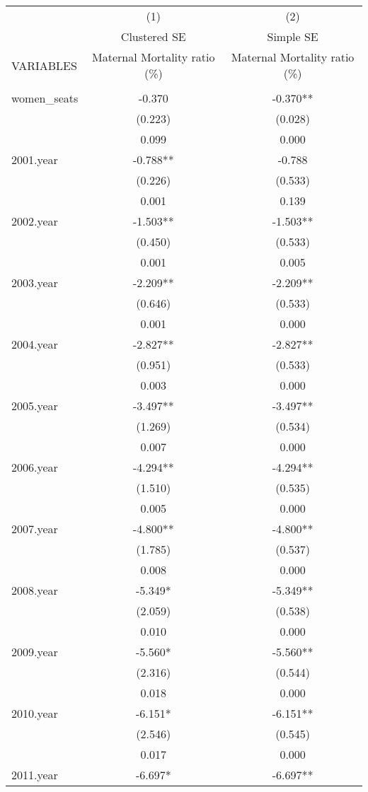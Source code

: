 \begin{tabular}{lcc} \hline
 & (1) & (2) \\
 & Clustered SE & Simple SE \\
VARIABLES & Maternal Mortality ratio (\%) & Maternal Mortality ratio (\%) \\ \hline
 &  &  \\
women\_seats & -0.370 & -0.370** \\
 & (0.223) & (0.028) \\
 & 0.099 & 0.000 \\
2001.year & -0.788** & -0.788 \\
 & (0.226) & (0.533) \\
 & 0.001 & 0.139 \\
2002.year & -1.503** & -1.503** \\
 & (0.450) & (0.533) \\
 & 0.001 & 0.005 \\
2003.year & -2.209** & -2.209** \\
 & (0.646) & (0.533) \\
 & 0.001 & 0.000 \\
2004.year & -2.827** & -2.827** \\
 & (0.951) & (0.533) \\
 & 0.003 & 0.000 \\
2005.year & -3.497** & -3.497** \\
 & (1.269) & (0.534) \\
 & 0.007 & 0.000 \\
2006.year & -4.294** & -4.294** \\
 & (1.510) & (0.535) \\
 & 0.005 & 0.000 \\
2007.year & -4.800** & -4.800** \\
 & (1.785) & (0.537) \\
 & 0.008 & 0.000 \\
2008.year & -5.349* & -5.349** \\
 & (2.059) & (0.538) \\
 & 0.010 & 0.000 \\
2009.year & -5.560* & -5.560** \\
 & (2.316) & (0.544) \\
 & 0.018 & 0.000 \\
2010.year & -6.151* & -6.151** \\
 & (2.546) & (0.545) \\
 & 0.017 & 0.000 \\
2011.year & -6.697* & -6.697** \\

\end{tabular}
